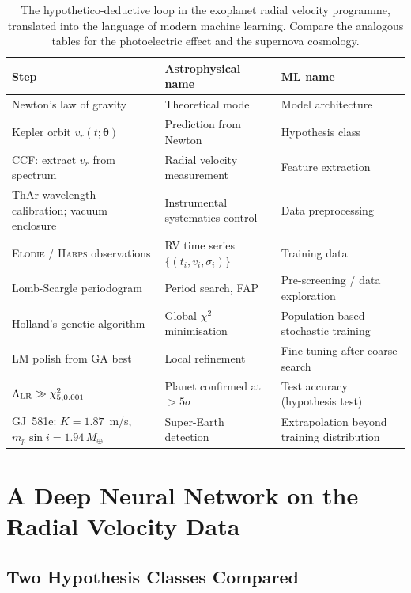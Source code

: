 \documentclass[12pt]{article}
\begin{document}
\begin{table}[ht]
\centering
\caption{The hypothetico-deductive loop in the exoplanet radial
velocity programme, translated into the language of modern
machine learning.  Compare the analogous tables for the
photoelectric effect and the supernova cosmology.}
\label{tab:loop}
\begin{tabular}{p{3.6cm}p{4.0cm}p{4.0cm}}
\toprule
Step & Astrophysical name & ML name \\
\midrule
Newton's law of gravity & Theoretical model & Model architecture \\
Kepler orbit $v_r(t;\boldsymbol\theta)$ & Prediction from Newton &
  Hypothesis class \\
CCF: extract $v_r$ from spectrum & Radial velocity measurement &
  Feature extraction \\
ThAr wavelength calibration; vacuum enclosure &
  Instrumental systematics control & Data preprocessing \\
\textsc{Elodie} / \textsc{Harps} observations &
  RV time series $\{(t_i, v_i, \sigma_i)\}$ & Training data \\
Lomb-Scargle periodogram & Period search, FAP &
  Pre-screening / data exploration \\
Holland's genetic algorithm & Global $\chi^2$ minimisation &
  Population-based stochastic training \\
LM polish from GA best & Local refinement &
  Fine-tuning after coarse search \\
$\Lambda_{\rm LR} \gg \chi^2_{5,0.001}$ & Planet confirmed at $>5\sigma$ &
  Test accuracy (hypothesis test) \\
GJ~581e: $K = 1.87$~m/s, $m_p\sin i = 1.94\,M_\oplus$ &
  Super-Earth detection & Extrapolation beyond training distribution \\
\bottomrule
\end{tabular}
\end{table}

\section{A Deep Neural Network on the Radial Velocity Data}
\label{sec:dnn}

\subsection{Two Hypothesis Classes Compared}
\end{document}
